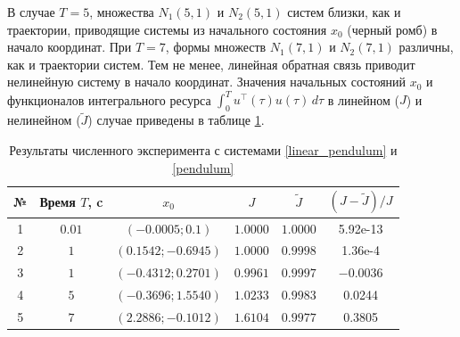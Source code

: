 \documentclass[../main.tex]{subfiles}
\begin{document}
\begin{pr}
	В случае $ T = 5$, множества  $N_1(5,1) $  и $ N_2(5,1) $ систем  близки, как и траектории, приводящие системы из начального состояния $x_0$ (черный ромб) в начало координат.  При $T = 7$, формы множеств $N_1(7,1) $ и  $ N_2(7,1) $ различны, как и траектории систем. Тем не менее, линейная обратная связь приводит нелинейную систему в начало координат.
	Значения начальных состояний $x_0$ и функционалов интегрального ресурса $ \displaystyle{\int_0^T u^{\top}(\tau) u(\tau) \, d\tau}$ в линейном ($ J $) и нелинейном ($ \widetilde{J} $) случае приведены в таблице \ref{Example1_table}.
	\end{pr}
	\begin{table}[h!]
	\begin{center}
	\caption{Результаты численного эксперимента с системами \eqref{linear_pendulum} и \eqref{pendulum}}
	\label{Example1_table}
	\begin{tabular}{c|c|c|c|c|c}
	№       & Время $T$, c    &  $x_0$                  & $ J $                & $ \widetilde{J} $  & $  ( J -  \widetilde{J} ) / J$ \\ \hline
	1       & $0.01 $         & $ (-0.0005; 0.1) $      & $ 1.0000 $           & $ 1.0000 $         &  5.92e-13  \\ \hline %
	2       & $ 1 $           & $ (0.1542; -0.6945) $   & $ 1.0000 $           & $ 0.9998 $         &  1.36e-4  \\ \hline %
	3       & $ 1 $           & $ (-0.4312; 0.2701) $   & $ 0.9961 $           & $ 0.9997 $         &  $-0.0036$  \\ \hline %
	4       & $5 $            & $ (-0.3696; 1.5540) $   & $ 1.0233 $           & $ 0.9983 $         & 0.0244   \\ \hline %
	5       & $ 7 $           & $ (2.2886; -0.1012) $   & $ 1.6104 $           & $ 0.9977 $         & 0.3805   %
	\end{tabular}
	\end{center}
	\end{table}
\end{document}
